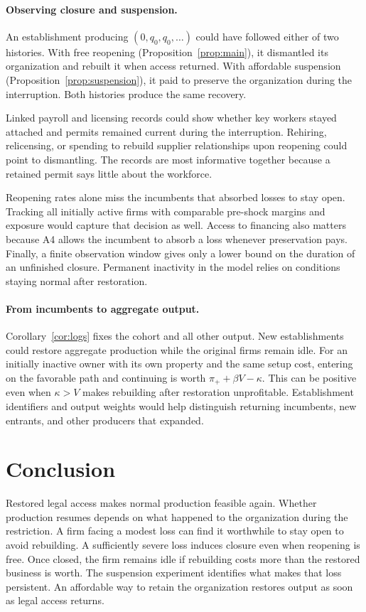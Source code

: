 \documentclass[11pt,letterpaper]{article}
\begin{document}
\paragraph{Observing closure and suspension.}
An establishment producing $(0,q_0,q_0,\ldots)$ could have followed either of two histories. With free reopening (Proposition~\ref{prop:main}), it dismantled its organization and rebuilt it when access returned. With affordable suspension (Proposition~\ref{prop:suspension}), it paid to preserve the organization during the interruption. Both histories produce the same recovery.

Linked payroll and licensing records could show whether key workers stayed attached and permits remained current during the interruption. Rehiring, relicensing, or spending to rebuild supplier relationships upon reopening could point to dismantling. The records are most informative together because a retained permit says little about the workforce.

Reopening rates alone miss the incumbents that absorbed losses to stay open. Tracking all initially active firms with comparable pre-shock margins and exposure would capture that decision as well. Access to financing also matters because A4 allows the incumbent to absorb a loss whenever preservation pays. Finally, a finite observation window gives only a lower bound on the duration of an unfinished closure. Permanent inactivity in the model relies on conditions staying normal after restoration.

\paragraph{From incumbents to aggregate output.}
Corollary~\ref{cor:logs} fixes the cohort and all other output. New establishments could restore aggregate production while the original firms remain idle. For an initially inactive owner with its own property and the same setup cost, entering on the favorable path and continuing is worth $\pi_++\beta V-\kappa$. This can be positive even when $\kappa>V$ makes rebuilding after restoration unprofitable. Establishment identifiers and output weights would help distinguish returning incumbents, new entrants, and other producers that expanded.

\section{Conclusion}
Restored legal access makes normal production feasible again. Whether production resumes depends on what happened to the organization during the restriction. A firm facing a modest loss can find it worthwhile to stay open to avoid rebuilding. A sufficiently severe loss induces closure even when reopening is free. Once closed, the firm remains idle if rebuilding costs more than the restored business is worth. The suspension experiment identifies what makes that loss persistent. An affordable way to retain the organization restores output as soon as legal access returns.
\end{document}

